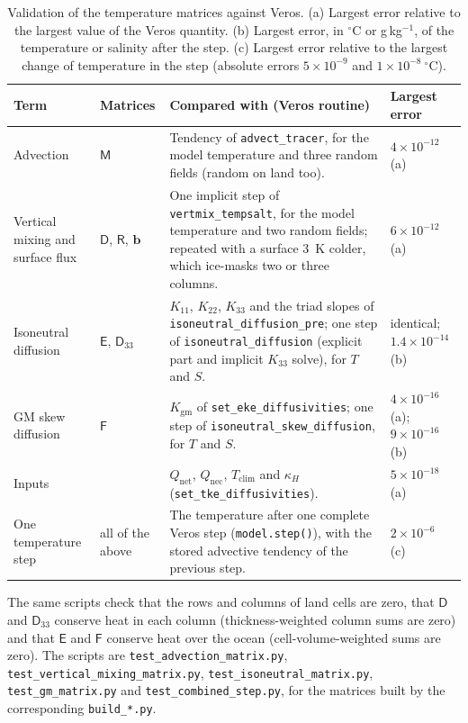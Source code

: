\documentclass{article}
\begin{document}
\begin{table}[h]
\centering
\small
\renewcommand{\arraystretch}{1.2}
%
\begin{tabular}{>{\raggedright\arraybackslash}p{}|>{\raggedright\arraybackslash}p{}|>{\raggedright\arraybackslash}p{}|>{\raggedright\arraybackslash}p{}}
\toprule
Term & Matrices & Compared with (Veros routine) & Largest error \\
\midrule
Advection & $\mathsf{M}$ & Tendency of \texttt{advect\_tracer}, for the model temperature and three random fields (random on land too). & $4\times10^{-12}$ (a) \\
Vertical mixing and surface flux & $\mathsf{D}$, $\mathsf{R}$, $\mathbf{b}$ & One implicit step of \texttt{vertmix\_tempsalt}, for the model temperature and two random fields; repeated with a surface 3~K colder, which ice-masks two or three columns. & $6\times10^{-12}$ (a) \\
Isoneutral diffusion & $\mathsf{E}$, $\mathsf{D}_{33}$ & $K_{11}$, $K_{22}$, $K_{33}$ and the triad slopes of \texttt{isoneutral\_diffusion\_pre}; one step of \texttt{isoneutral\_diffusion} (explicit part and implicit $K_{33}$ solve), for $T$ and $S$. & identical; $1.4\times10^{-14}$ (b) \\
GM skew diffusion & $\mathsf{F}$ & $K_\text{gm}$ of \texttt{set\_eke\_diffusivities}; one step of \texttt{isoneutral\_skew\_diffusion}, for $T$ and $S$. & $4\times10^{-16}$ (a); $9\times10^{-16}$ (b) \\
Inputs & & $Q_\text{net}$, $Q_\text{nec}$, $T_\text{clim}$ and $\kappa_H$ (\texttt{set\_tke\_diffusivities}). & $5\times10^{-18}$ (a) \\
\midrule
One temperature step & all of the above & The temperature after one complete Veros step (\texttt{model.step()}), with the stored advective tendency of the previous step. & $2\times10^{-6}$ (c) \\
\bottomrule
\end{tabular}
\caption{Validation of the temperature matrices against Veros. (a) Largest error relative to the largest value of the Veros quantity. (b) Largest error, in $^\circ$C or g\,kg$^{-1}$, of the temperature or salinity after the step. (c) Largest error relative to the largest change of temperature in the step (absolute errors $5\times10^{-9}$ and $1\times10^{-8}~^\circ$C).}
\label{tab:validation}
\end{table}

The same scripts check that the rows and columns of land cells are zero, that $\mathsf{D}$ and $\mathsf{D}_{33}$ conserve heat in each column (thickness-weighted column sums are zero) and that $\mathsf{E}$ and $\mathsf{F}$ conserve heat over the ocean (cell-volume-weighted sums are zero). The scripts are \texttt{test\_advection\_matrix.py}, \texttt{test\_vertical\_mixing\_matrix.py}, \texttt{test\_isoneutral\_matrix.py}, \texttt{test\_gm\_matrix.py} and \texttt{test\_combined\_step.py}, for the matrices built by the corresponding \texttt{build\_*.py}.
\end{document}
